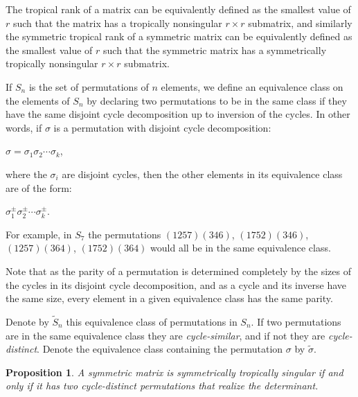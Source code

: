 \documentclass{article}
\begin{document}
The tropical rank of a matrix can be equivalently defined as the smallest value of $r$ such that the matrix has a tropically nonsingular $r \times r$ submatrix, and similarly the symmetric tropical rank of a symmetric matrix can be equivalently defined as the smallest value of $r$ such that the symmetric matrix has a symmetrically tropically nonsingular $r \times r$ submatrix. 

If $S_{n}$ is the set of permutations of $n$ elements, we define an equivalence class on the elements of $S_{n}$ by declaring two permutations to be in the same class if they have the same disjoint cycle decomposition up to inversion of the cycles. In other words, if $\sigma$ is a permutation with disjoint cycle decomposition:
\begin{center}
  $\sigma = \sigma_{1}\sigma_{2} \cdots \sigma_{k}$,
\end{center}
where the $\sigma_{i}$ are disjoint cycles, then the other elements in its equivalence class are of the form:
\begin{center}
  $\sigma_{1}^{\pm}\sigma_{2}^{\pm} \cdots \sigma_{k}^{\pm}$.
\end{center}
For example, in $S_{7}$ the permutations $(1257)(346)$, $(1752)(346)$, $(1257)(364)$, $(1752)(364)$ would all be in the same equivalence class.

Note that as the parity of a permutation is determined completely by the sizes of the cycles in its disjoint cycle decomposition, and as a cycle and its inverse have the same size, every element in a given equivalence class has the same parity.

Denote by $\tilde{S}_{n}$ this equivalence class of permutations in $S_{n}$. If two permutations are in the same equivalence class they are \emph{cycle-similar}, and if not they are \emph{cycle-distinct}. Denote the equivalence class containing the permutation $\sigma$ by $\tilde{\sigma}$.

\newtheorem{prop}{Proposition}
\begin{prop} 
  A symmetric matrix is symmetrically tropically singular if and only if it has two cycle-distinct permutations that realize the determinant.
\end{prop}
\end{document}
